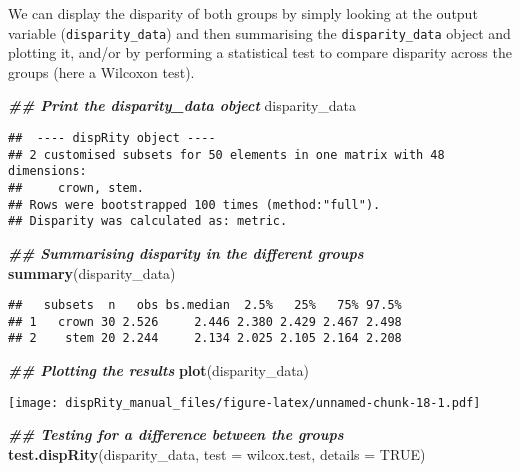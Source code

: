 \documentclass[
]{book}
\newenvironment{Shaded}{\begin{snugshade}}{\end{snugshade}}
\newcommand{\AttributeTok}[1]{\textcolor[rgb]{0.13,0.29,0.53}{#1}}
\newcommand{\ConstantTok}[1]{\textcolor[rgb]{0.56,0.35,0.01}{#1}}
\newcommand{\DocumentationTok}[1]{\textcolor[rgb]{0.56,0.35,0.01}{\textbf{\textit{#1}}}}
\newcommand{\FunctionTok}[1]{\textcolor[rgb]{0.13,0.29,0.53}{\textbf{#1}}}
\newcommand{\NormalTok}[1]{#1}
\begin{document}
We can display the disparity of both groups by simply looking at the output variable (\texttt{disparity\_data}) and then summarising the \texttt{disparity\_data} object and plotting it, and/or by performing a statistical test to compare disparity across the groups (here a Wilcoxon test).

\begin{Shaded}
\begin{Highlighting}[]
\DocumentationTok{\#\# Print the disparity\_data object}
\NormalTok{disparity\_data}
\end{Highlighting}
\end{Shaded}

\begin{verbatim}
##  ---- dispRity object ---- 
## 2 customised subsets for 50 elements in one matrix with 48 dimensions:
##     crown, stem.
## Rows were bootstrapped 100 times (method:"full").
## Disparity was calculated as: metric.
\end{verbatim}

\begin{Shaded}
\begin{Highlighting}[]
\DocumentationTok{\#\# Summarising disparity in the different groups}
\FunctionTok{summary}\NormalTok{(disparity\_data)}
\end{Highlighting}
\end{Shaded}

\begin{verbatim}
##   subsets  n   obs bs.median  2.5%   25%   75% 97.5%
## 1   crown 30 2.526     2.446 2.380 2.429 2.467 2.498
## 2    stem 20 2.244     2.134 2.025 2.105 2.164 2.208
\end{verbatim}

\begin{Shaded}
\begin{Highlighting}[]
\DocumentationTok{\#\# Plotting the results}
\FunctionTok{plot}\NormalTok{(disparity\_data)}
\end{Highlighting}
\end{Shaded}

\texttt{[image: dispRity\_manual\_files/figure-latex/unnamed-chunk-18-1.pdf]}

\begin{Shaded}
\begin{Highlighting}[]
\DocumentationTok{\#\# Testing for a difference between the groups}
\FunctionTok{test.dispRity}\NormalTok{(disparity\_data, }\AttributeTok{test =}\NormalTok{ wilcox.test, }\AttributeTok{details =} \ConstantTok{TRUE}\NormalTok{)}
\end{Highlighting}
\end{Shaded}
\end{document}
